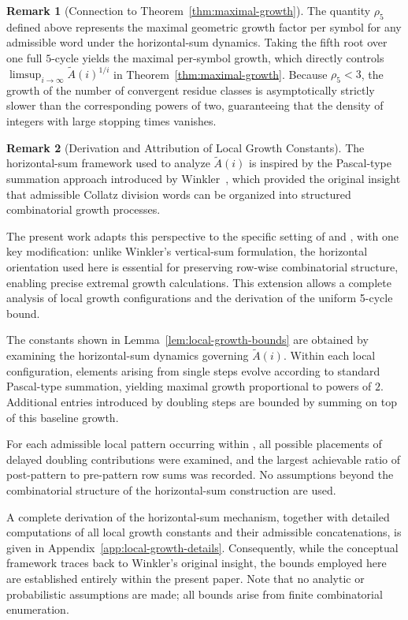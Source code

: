 \documentclass[12pt, oneside]{article}   	%
\numberwithin{equation}{section}          %
\theoremstyle{definition}
\newtheorem*{remark}{Remark}
\begin{document}
\begin{remark}[Connection to Theorem~\ref{thm:maximal-growth}]
The quantity \(\rho_5\) defined above represents the maximal geometric growth factor
per symbol for any admissible word under the horizontal-sum dynamics.  Taking the fifth
root over one full $5$-cycle yields the maximal per-symbol growth, which directly controls 
\(\limsup_{i\to\infty} \widetilde A(i)^{1/i}\) in Theorem~\ref{thm:maximal-growth}. 
Because \(\rho_5 < 3\), the growth of the number of convergent residue classes is
asymptotically strictly slower than the corresponding powers of two, guaranteeing
that the density of integers with large stopping times vanishes.
\end{remark}

\begin{remark}[Derivation and Attribution of Local Growth Constants]
The horizontal-sum framework used to analyze $\widetilde A(i)$ is inspired by
the Pascal-type summation approach introduced by Winkler~\cite{Winkler2017},
which provided the original insight that admissible Collatz division words can
be organized into structured combinatorial growth processes.  

The present work adapts this perspective to the specific setting of
 and , with one key modification: unlike
Winkler's vertical-sum formulation, the horizontal orientation used here is
essential for preserving row-wise combinatorial structure, enabling precise
extremal growth calculations. This extension allows a complete analysis of
local growth configurations and the derivation of the uniform 5-cycle bound.

The constants shown in Lemma~\ref{lem:local-growth-bounds} are obtained by
examining the horizontal-sum dynamics governing $\widetilde A(i)$.
Within each local configuration, elements arising from single steps evolve
according to standard Pascal-type summation, yielding maximal growth
proportional to powers of $2$. Additional entries introduced by doubling steps
are bounded by summing on top of this baseline growth.

For each admissible local pattern occurring within , all possible
placements of delayed doubling contributions were examined, and the largest
achievable ratio of post-pattern to pre-pattern row sums was recorded. No
assumptions beyond the combinatorial structure of the horizontal-sum
construction are used.

A complete derivation of the horizontal-sum mechanism, together with detailed
computations of all local growth constants and their admissible concatenations,
is given in Appendix~\ref{app:local-growth-details}. Consequently, while the
conceptual framework traces back to Winkler’s original insight, the bounds
employed here are established entirely within the present paper.  Note that no
analytic or probabilistic assumptions are made; all bounds arise from finite
combinatorial enumeration.


\end{remark}
\end{document}
